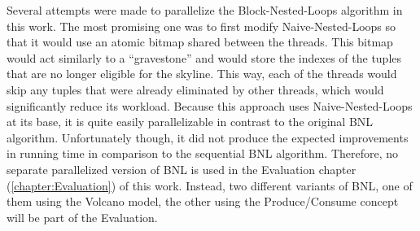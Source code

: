 Several attempts were made to parallelize the Block-Nested-Loops algorithm in this work. The most promising one was to first modify Naive-Nested-Loops so that it would use an atomic bitmap shared between the threads. This bitmap would act similarly to a  ``gravestone'' and would store the indexes of the tuples that are no longer eligible for the skyline. This way, each of the threads would skip any tuples that were already eliminated by other threads, which would significantly reduce its workload. Because this approach uses Naive-Nested-Loops at its base, it is quite easily parallelizable in contrast to the original BNL algorithm. Unfortunately though, it did not produce the expected improvements in running time in comparison to the sequential BNL algorithm. Therefore, no separate parallelized version of BNL is used in the Evaluation chapter (\ref{chapter:Evaluation}) of this work. Instead, two different variants of BNL, one of them using the Volcano model, the other using the Produce/Consume concept will be part of the Evaluation. 

